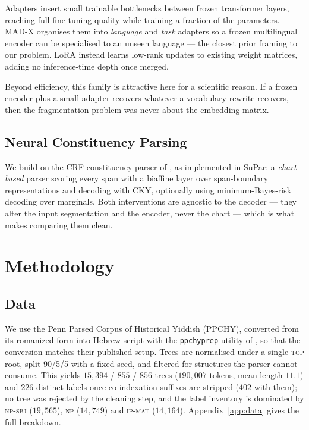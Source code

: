 \documentclass[11pt]{article}
\begin{document}
Adapters \citep{houlsby-etal-2019-parameter} insert small trainable bottlenecks
between frozen transformer layers, reaching full fine-tuning quality while
training a fraction of the parameters. MAD-X \citep{pfeiffer-etal-2020-mad}
organises them into \emph{language} and \emph{task} adapters so a frozen
multilingual encoder can be specialised to an unseen language --- the closest
prior framing to our problem. LoRA \citep{hu-etal-2022-lora} instead learns
low-rank updates to existing weight matrices, adding no inference-time depth once
merged.

Beyond efficiency, this family is attractive here for a scientific reason. If a
frozen encoder plus a small adapter recovers whatever a vocabulary rewrite
recovers, then the fragmentation problem was never about the embedding matrix.

\subsection{Neural Constituency Parsing}

We build on the CRF constituency parser of \citet{zhang-etal-2020-fast}, as
implemented in SuPar: a \emph{chart-based} parser scoring every span with a
biaffine layer over span-boundary representations and decoding with CKY, optionally
using minimum-Bayes-risk decoding over marginals. Both interventions are agnostic
to the decoder --- they alter the input segmentation and the encoder, never the
chart --- which is what makes comparing them clean.

\section{Methodology}

\subsection{Data}
\label{sec:data}
We use the Penn Parsed Corpus of Historical Yiddish (PPCHY), converted from its
romanized form into Hebrew script with the \texttt{ppchyprep} utility of
\citet{kulick-etal-2022-part}, so that the conversion matches their published
setup. Trees are normalised under a single \textsc{top} root, split 90/5/5 with
a fixed seed, and filtered for structures the parser cannot consume.
This yields $15{,}394$ / $855$ / $856$ trees ($190{,}007$ tokens, mean length
$11.1$) and $226$ distinct labels once co-indexation suffixes are stripped ($402$
with them); no tree was rejected by the cleaning step, and the label inventory is
dominated by \textsc{np-sbj} ($19{,}565$), \textsc{np} ($14{,}749$) and
\textsc{ip-mat} ($14{,}164$). Appendix~\ref{app:data} gives the full breakdown.
\end{document}
